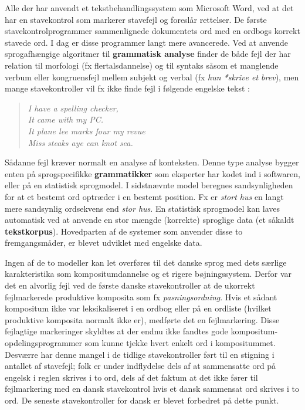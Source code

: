\begin{multicols}{2}
 Alle der har anvendt et tekstbehandlingssystem som Microsoft Word, ved at det har en stavekontrol som mar\-kerer stavefejl og foresl\aa r rettelser. De f\o rste stavekontrolprogrammer sammenlignede dokumentets ord med en ordbogs korrekt stavede ord. I dag er disse programmer langt mere avancerede. Ved at anvende sprogafh\ae ngige algoritmer til {\bf grammatisk analyse} finder de b\aa de fejl der har relation til morfologi (fx flertalsdannelse) og til syntaks s\aa som et manglende verbum eller kongruensfejl mellem subjekt og verbal (fx {\it hun *skrive et brev}), men mange stavekontroller vil fx ikke finde fejl i f\o lgende engelske tekst \cite{zar1}:

\begin{quote}
 {\it  I have a spelling checker,\\
  It came with my PC.\\
  It plane lee marks four my revue\\
  Miss steaks aye can knot sea.}
\end{quote}

S\aa danne fejl kr\ae ver normalt en analyse af konteksten. Denne type analyse bygger enten \mbox{p\aa} sprogspecifikke {\bf grammatikker} som eksperter har kodet ind i softwaren, eller \mbox{p\aa} en statistisk sprogmodel. I sidstn\ae vnte model beregnes sandsynligheden for at et bestemt ord optr\ae der i en bestemt position. Fx er {\it stort hus}  en langt mere sandsynlig ordsekvens end {\it stor hus}. En statistisk sprogmodel kan laves automatisk ved at anvende en stor m\ae ngde (korrekte) sproglige data (et s\aa kaldt {\bf tekstkorpus}). Hovedparten af de systemer som anvender disse to fremgangsm\aa der, er blevet udviklet med engelske data. 

Ingen af de to modeller kan let overf\o res til det danske sprog med dets s\ae rlige karakteristika som kompositumdannelse og et rigere b\o jningssystem. Derfor var det en alvorlig fejl ved de f\o rste danske stavekontroller at de ukorrekt fejlmarkerede produktive komposita som fx {\it pasningsordning}. Hvis et s\aa dant kompositum ikke var leksikaliseret i en ordbog eller \mbox{p\aa} en ordliste (hvilket produktive komposita normalt ikke er), medf\o rte det en fejlmarkering. Disse fejlagtige markeringer skyldtes at der endnu ikke fandtes gode kompositum-opdelingsprogrammer som kunne tjekke hvert enkelt ord i kompositummet. Desv\ae rre har denne mangel i de tidlige stavekontroller f\o rt til en stigning i antallet af stavefejl; folk er under indflydelse dels af at sammensatte ord \mbox{p\aa} engelsk i reglen skrives i to ord, dels af det faktum at det ikke f\o rer til fejlmarkering med en dansk stavekontrol hvis et dansk sammensat ord skrives i to ord.  De seneste stavekontroller for dansk er blevet forbedret \mbox{p\aa} dette punkt.


\end{multicols}
